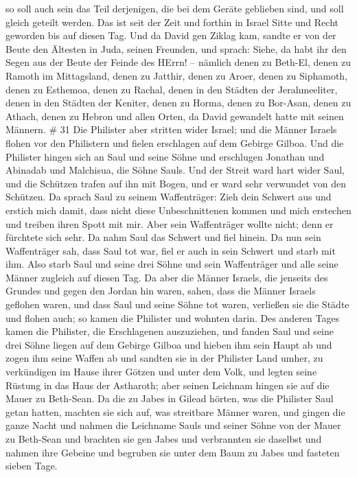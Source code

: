 so soll auch sein das Teil derjenigen, die bei dem Geräte geblieben
sind, und soll gleich geteilt werden.  Das ist seit der
Zeit und forthin in Israel Sitte und Recht geworden bis auf diesen Tag.
 Und da David gen Ziklag kam, sandte er von der Beute den
Ältesten in Juda, seinen Freunden, und sprach: Siehe, da habt ihr den
Segen aus der Beute der Feinde des HErrn! --  nämlich denen
zu Beth-El, denen zu Ramoth im Mittagsland, denen zu Jatthir,
 denen zu Aroer, denen zu Siphamoth, denen zu Esthemoa,
 denen zu Rachal, denen in den Städten der Jerahmeeliter,
denen in den Städten der Keniter,  denen zu Horma, denen zu
Bor-Asan, denen zu Athach,  denen zu Hebron und allen
Orten, da David gewandelt hatte mit seinen Männern. \# 31 
Die Philister aber stritten wider Israel; und die Männer Israels flohen
vor den Philistern und fielen erschlagen auf dem Gebirge Gilboa.
 Und die Philister hingen sich an Saul und seine Söhne und
erschlugen Jonathan und Abinadab und Malchisua, die Söhne Sauls.
 Und der Streit ward hart wider Saul, und die Schützen
trafen auf ihn mit Bogen, und er ward sehr verwundet von den Schützen.
 Da sprach Saul zu seinem Waffenträger: Zieh dein Schwert
aus und erstich mich damit, dass nicht diese Unbeschnittenen kommen und
mich erstechen und treiben ihren Spott mit mir. Aber sein Waffenträger
wollte nicht; denn er fürchtete sich sehr. Da nahm Saul das Schwert und
fiel hinein.  Da nun sein Waffenträger sah, dass Saul tot
war, fiel er auch in sein Schwert und starb mit ihm.  Also
starb Saul und seine drei Söhne und sein Waffenträger und alle seine
Männer zugleich auf diesen Tag.  Da aber die Männer Israels,
die jenseits des Grundes und gegen den Jordan hin waren, sahen, dass die
Männer Israels geflohen waren, und dass Saul und seine Söhne tot waren,
verließen sie die Städte und flohen auch; so kamen die Philister und
wohnten darin.  Des anderen Tages kamen die Philister, die
Erschlagenen auszuziehen, und fanden Saul und seine drei Söhne liegen
auf dem Gebirge Gilboa  und hieben ihm sein Haupt ab und
zogen ihm seine Waffen ab und sandten sie in der Philister Land umher,
zu verkündigen im Hause ihrer Götzen und unter dem Volk, 
und legten seine Rüstung in das Haus der Astharoth; aber seinen Leichnam
hingen sie auf die Mauer zu Beth-Sean.  Da die zu Jabes in
Gilead hörten, was die Philister Saul getan hatten, 
machten sie sich auf, was streitbare Männer waren, und gingen die ganze
Nacht und nahmen die Leichname Sauls und seiner Söhne von der Mauer zu
Beth-Sean und brachten sie gen Jabes und verbrannten sie daselbst
 und nahmen ihre Gebeine und begruben sie unter dem Baum zu
Jabes und fasteten sieben Tage.
